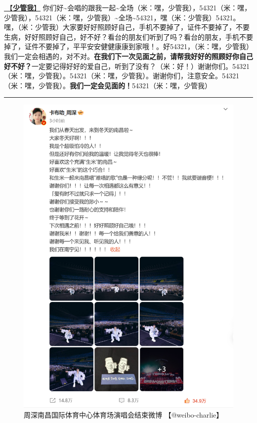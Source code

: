 \documentclass[]{ctexbook}
\begin{document}
\hyperref[watch-ur-manners]{🎵【\textbf{少管我}】} 你们好\textasciitilde 会唱的跟我一起\textasciitilde 全场（米：嘿，少管我），54321（米：嘿，少管我），54321（米：嘿，少管我）\textasciitilde 全场\textasciitilde54321，嘿（米：少管我）54321。嘿，（米：少管我）大家要好好照顾好自己，手机不要掉了，证件不要掉了，不要生病，好好照顾好自己，好不好？看台的朋友们听到了吗？看台的朋友，手机不要掉了，证件不要掉了，平平安安健健康康到家哦！。好54321，（米：嘿，少管我）我们一定会相遇的，对不对。\textbf{在我们下一次见面之前，请帮我好好的照顾好你自己好不好？}一定要记得好好的爱自己，听到了没有？（米：好！）谢谢你们。54321（米：嘿，少管我）。54321（米：嘿，少管我）。谢谢你们，注意安全。54321（米：嘿，少管我）。\textbf{我们一定会见面的！}54321（米：嘿，少管我）

\begin{center}\rule{0.5\linewidth}{0.5pt}\end{center}

\begin{figure}

{\centering \includegraphics{img/weibo/nanchang-20241123} 

}

\caption{周深南昌国际体育中心体育场演唱会结束微博 【@weibo-charlie】}\label{fig:unnamed-chunk-125}
\end{figure}
\end{document}
